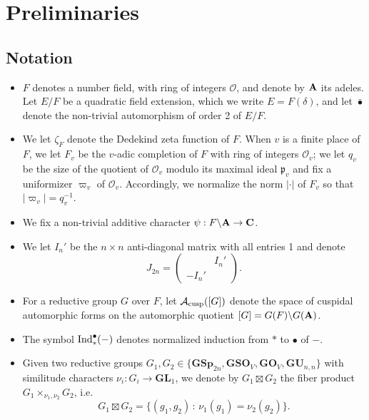 \documentclass[11pt, reqno]{amsart}
\theoremstyle{plain}
\theoremstyle{definition}
\theoremstyle{remark}
\theoremstyle{plain}
\def\C{{\bf C}}
\def\A{{\bf A}}
\def\GSp{{\mathbf{GSp}}}
\def\GU{{\mathbf{GU}}}
\def\GO{{\mathbf{GO}}}
\def\GSO{{\mathbf{GSO}}}
\def\GL{\mathbf{GL}}
\begin{document}
\section{Preliminaries}

\subsection{Notation}\label{subsec_notation} \begin{itemize}
    \item $F$ denotes a number field, with ring of integers $\mathcal{O}$, and denote by $\A$ its adeles. Let $E/F$ be a quadratic field extension, which we write $E=F(\delta)$, and let $\bar{\bullet}$ denote the non-trivial automorphism of order 2 of $E/F$. 
    \item We let $\zeta_F$ denote the Dedekind zeta function of $F$. When $v$ is a finite place of $F$, we let $F_v$ be the $v$-adic completion of $F$ with ring of integers $\mathcal{O}_v$; we let $q_v$ be the size of the quotient of $\mathcal{O}_v$ modulo its maximal ideal $\mathfrak{p}_v$ and fix a uniformizer  $\varpi_v$ of $\mathcal{O}_v$. Accordingly, we normalize the norm $|\cdot |$ of $F_v$ so that $|\varpi_v| = q_v^{-1}$. 
    \item We fix a non-trivial additive character $\psi: F \backslash \A \to \C$.
    \item We let $I_n'$  be the $n \times n$ anti-diagonal matrix with all entries 1 and denote 
$$ J_{2n}=\left( \begin{smallmatrix}  & I_n' \\ -I_n' & \end{smallmatrix} \right).$$
\item For a reductive group $G$ over $F$, let $\mathcal{A}_{\rm cusp}([G])$ denote the space of cuspidal automorphic forms on the automorphic quotient $[G] = G(F)\backslash G(\A)$.
\item The symbol ${\rm Ind}_*^\bullet(-)$ denotes normalized induction from $*$ to $\bullet$ of $-$. 
\item Given two reductive groups $G_1,G_2 \in \{\GSp_{2n},\GSO_V,\GO_V,\GU_{n,n}\}$ with similitude characters $\nu_i : G_i \to \GL_1$, we denote by $G_1 \boxtimes G_2$ the fiber product $G_1 \times_{\nu_1,\nu_2} G_2$, i.e. 
$$G_1 \boxtimes G_2 = \{(g_1,g_2) \,:\, \nu_1(g_1)=\nu_2(g_2) \}.$$
\end{itemize} 

 
\end{document}
